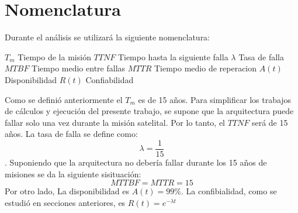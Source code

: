 \section{Nomenclatura}
Durante el análisis se utilizará la siguiente nomenclatura:

$T_m$ \tab Tiempo de la misión
$TTNF$ \tab Tiempo hasta la siguiente falla
$\lambda$ \tab Tasa de falla
$MTBF$ \tab Tiempo medio entre fallas
$MTTR$ \tab Tiempo medio de reperacion
$A(t)$ \tab Disponibilidad
$R(t)$ \tab Confiabilidad

Como se definió anteriormente el $T_m$ es de 15 años. Para simplificar los trabajos de cálculos y ejecución del presente trabajo, se supone que la arquitectura puede fallar solo una vez durante la misión satelital. Por lo tanto, el $TTNF$ será de 15 años. La tasa de falla se define como: $$\lambda = \frac{1}{15}$$. Suponiendo que la arquitectura no debería fallar durante los 15 años de misiones se da la siguiente sisituación: $$MTTBF = MTTR = 15 $$ Por otro lado, La disponibilidad es $A(t) = 99\%$. La confibialidad, como se estudió en secciones anteriores, es $R(t) = e^{- \lambda t}$


